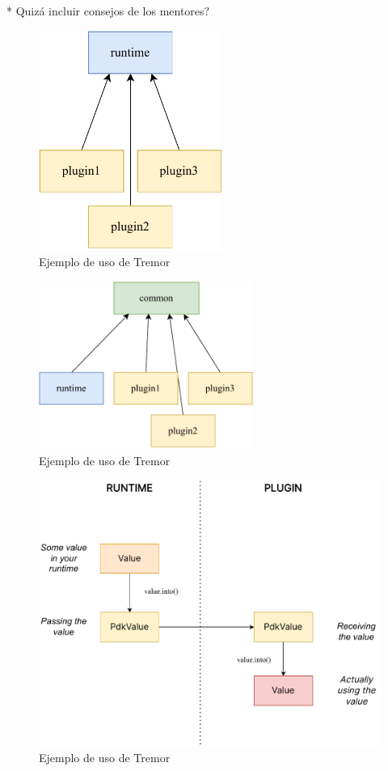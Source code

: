 * Quizá incluir consejos de los mentores?

\begin{figure}
    \centering
    \includegraphics[width=6cm]{./Imagenes/separation-temporary.pdf}
    \caption{Ejemplo de uso de Tremor}%
    \label{fig:separation_temporary}
\end{figure}

\begin{figure}
    \centering
    \includegraphics[width=7cm]{./Imagenes/separation.pdf}
    \caption{Ejemplo de uso de Tremor}%
    \label{fig:separation}
\end{figure}

\begin{figure}
    \centering
    \includegraphics[width=\textwidth]{./Imagenes/simplify.pdf}
    \caption{Ejemplo de uso de Tremor}%
    \label{fig:simplify}
\end{figure}
